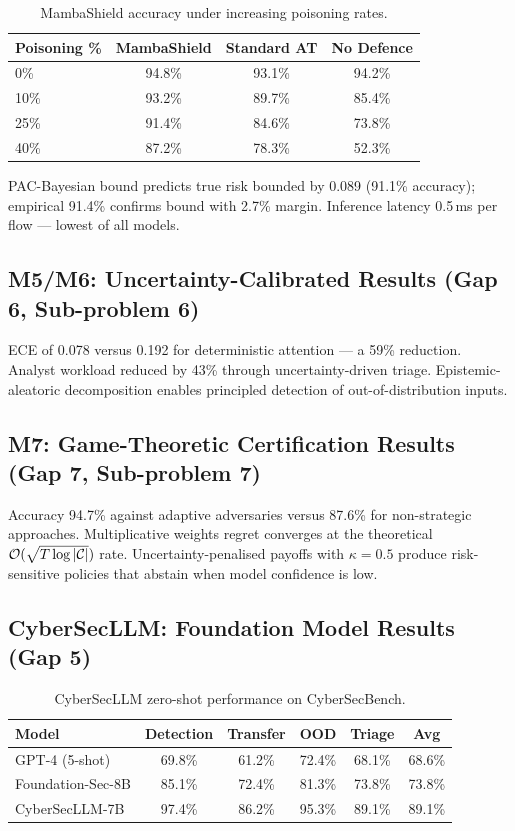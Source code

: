\begin{table}[htbp]
\centering
\caption{MambaShield accuracy under increasing poisoning rates.}
\label{tab:mamba_results}
\begin{tabular}{lccc}
\toprule
Poisoning \% & MambaShield & Standard AT & No Defence \\
\midrule
0\%  & 94.8\% & 93.1\% & 94.2\% \\
10\% & 93.2\% & 89.7\% & 85.4\% \\
25\% & 91.4\% & 84.6\% & 73.8\% \\
40\% & 87.2\% & 78.3\% & 52.3\% \\
\bottomrule
\end{tabular}
\end{table}

PAC-Bayesian bound predicts true risk bounded by 0.089 (91.1\% accuracy); empirical 91.4\% confirms bound with 2.7\% margin. Inference latency 0.5\,ms per flow --- lowest of all models.


\subsection{M5/M6: Uncertainty-Calibrated Results (Gap 6, Sub-problem 6)}

ECE of 0.078 versus 0.192 for deterministic attention --- a 59\% reduction. Analyst workload reduced by 43\% through uncertainty-driven triage. Epistemic-aleatoric decomposition enables principled detection of out-of-distribution inputs.


\subsection{M7: Game-Theoretic Certification Results (Gap 7, Sub-problem 7)}

Accuracy 94.7\% against adaptive adversaries versus 87.6\% for non-strategic approaches. Multiplicative weights regret converges at the theoretical $\mathcal{O}(\sqrt{T\log|\mathcal{C}|})$ rate. Uncertainty-penalised payoffs with $\kappa=0.5$ produce risk-sensitive policies that abstain when model confidence is low.


\subsection{CyberSecLLM: Foundation Model Results (Gap 5)}

\begin{table}[htbp]
\centering
\caption{CyberSecLLM zero-shot performance on CyberSecBench.}
\label{tab:cybersecllm_results}
\begin{tabular}{lccccc}
\toprule
Model & Detection & Transfer & OOD & Triage & Avg \\
\midrule
GPT-4 (5-shot)    & 69.8\% & 61.2\% & 72.4\% & 68.1\% & 68.6\% \\
Foundation-Sec-8B & 85.1\% & 72.4\% & 81.3\% & 73.8\% & 73.8\% \\
CyberSecLLM-7B    & 97.4\% & 86.2\% & 95.3\% & 89.1\% & 89.1\% \\
\bottomrule
\end{tabular}
\end{table}

